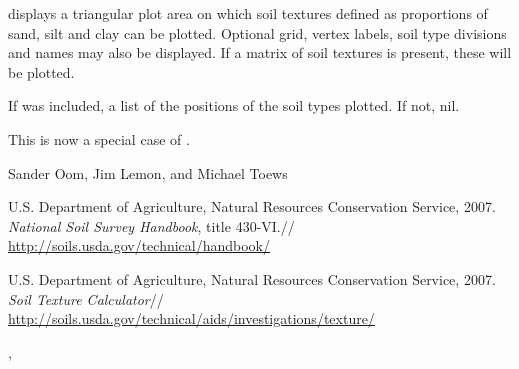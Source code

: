 \begin{Details}\relax
{} displays a triangular plot area on which soil
textures defined as proportions of sand, silt and clay can be plotted.
Optional grid, vertex labels, soil type divisions and names may also
be displayed. If a matrix of soil textures is present, these will be
plotted.
\end{Details}
\begin{Value}
If  was included, a list of the 
positions of the soil types plotted. If not, nil.
\end{Value}
\begin{Note}\relax
This is now a special case of .
\end{Note}
\begin{Author}\relax
Sander Oom, Jim Lemon, and Michael Toews
\end{Author}
\begin{References}\relax
U.S. Department of Agriculture, Natural Resources Conservation Service,
2007. \emph{National Soil Survey Handbook}, title 430-VI.//
\url{http://soils.usda.gov/technical/handbook/}

U.S. Department of Agriculture, Natural Resources Conservation Service,
2007. \emph{Soil Texture Calculator}//
\url{http://soils.usda.gov/technical/aids/investigations/texture/}
\end{References}
\begin{SeeAlso}\relax
{}, 
\end{SeeAlso}
\begin{Examples}
\end{Examples}

